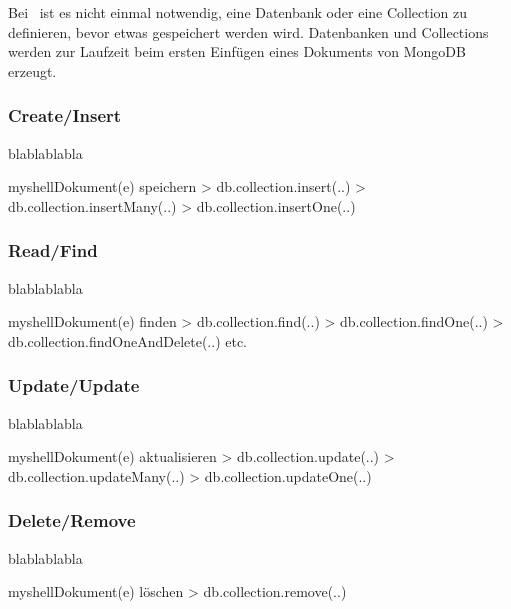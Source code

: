 Bei \mongo\ ist es nicht einmal notwendig, eine Datenbank oder eine Collection zu definieren, bevor etwas gespeichert werden wird. Datenbanken und Collections werden zur Laufzeit beim ersten Einfügen eines Dokuments von MongoDB erzeugt.

\subsubsection{Create/Insert}
blablablabla
\begin{listingsboxShell}[label={lst:insert}]{myshell}{Dokument(e) speichern}
> db.collection.insert(..)
> db.collection.insertMany(..)
> db.collection.insertOne(..)
\end{listingsboxShell}
\subsubsection{Read/Find}
blablablabla
\begin{listingsboxShell}[label={lst:find}]{myshell}{Dokument(e) finden}
> db.collection.find(..)
> db.collection.findOne(..)
> db.collection.findOneAndDelete(..) etc.
\end{listingsboxShell}
\subsubsection{Update/Update}
blablablabla
\begin{listingsboxShell}[label={lst:update}]{myshell}{Dokument(e) aktualisieren}
> db.collection.update(..)
> db.collection.updateMany(..)
> db.collection.updateOne(..)
\end{listingsboxShell}
\subsubsection{Delete/Remove}
blablablabla
\begin{listingsboxShell}[label={lst:remove}]{myshell}{Dokument(e) löschen}
> db.collection.remove(..)
\end{listingsboxShell}

